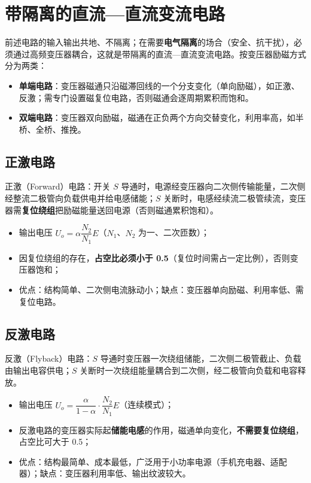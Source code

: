 \section{带隔离的直流—直流变流电路}

前述电路的输入输出共地、不隔离；在需要\textbf{电气隔离}的场合（安全、抗干扰），必须通过高频变压器耦合，这就是带隔离的直流—直流变流电路。按变压器励磁方式分为两类：

\begin{itemize}
  \item \textbf{单端电路}：变压器磁通只沿磁滞回线的一个分支变化（单向励磁），如正激、反激；需专门设置磁复位电路，否则磁通会逐周期累积而饱和。
  \item \textbf{双端电路}：变压器双向励磁，磁通在正负两个方向交替变化，利用率高，如半桥、全桥、推挽。
\end{itemize}

\subsection{正激电路}

正激（Forward）电路：开关 $S$ 导通时，电源经变压器向二次侧传输能量，二次侧经整流二极管向负载供电并给电感储能；$S$ 关断时，电感经续流二极管续流，变压器需\textbf{复位绕组}把励磁能量送回电源（否则磁通累积饱和）。

\begin{itemize}
  \item 输出电压 $U_o=\alpha\dfrac{N_2}{N_1}E$（$N_1$、$N_2$ 为一、二次匝数）；
  \item 因复位绕组的存在，\textbf{占空比必须小于 0.5}（复位时间需占一定比例），否则变压器饱和；
  \item 优点：结构简单、二次侧电流脉动小；缺点：变压器单向励磁、利用率低、需复位电路。
\end{itemize}

\subsection{反激电路}

反激（Flyback）电路：$S$ 导通时变压器一次绕组储能，二次侧二极管截止、负载由输出电容供电；$S$ 关断时一次绕组能量耦合到二次侧，经二极管向负载和电容释放。

\begin{itemize}
  \item 输出电压 $U_o=\dfrac{\alpha}{1-\alpha}\cdot\dfrac{N_2}{N_1}E$（连续模式）；
  \item 反激电路的变压器实际起\textbf{储能电感}的作用，磁通单向变化，\textbf{不需要复位绕组}，占空比可大于 0.5；
  \item 优点：结构最简单、成本最低，广泛用于小功率电源（手机充电器、适配器）；缺点：变压器利用率低、输出纹波较大。
\end{itemize}

